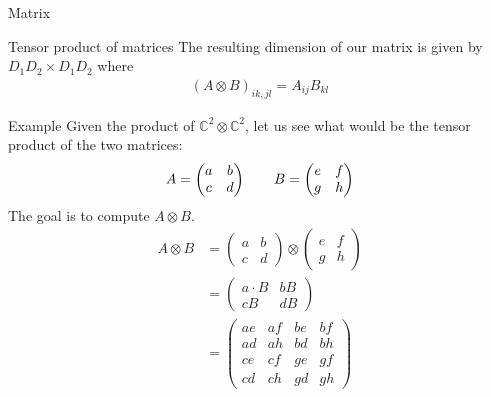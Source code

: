 \begin{parag}{Matrix}
\begin{subparag}{Tensor product of matrices}
		The resulting dimension of our matrix is given by $D_1D_2 \times D_1 D_2$ where
		\begin{align*} 
			 \left(A \otimes B\right)_{ik, jl} =  A_{ij} B_{kl}
		\end{align*}
	\end{subparag}
	\begin{subparag}{Example}
	    Given the product of $\mathbb{C}^2 \otimes \mathbb{C}^2$, let us see what would be the tensor product of the two matrices:
		\begin{align*} 
			A = \begin{pmatrix} a & b \\ c & d \end{pmatrix}   \quad \quad B = \begin{pmatrix} e & f \\ g & h \end{pmatrix} 
		\end{align*}
		The goal is to compute $A \otimes B$.
		\begin{align*} 
			A \otimes B &=  \begin{pmatrix} a & b \\ c & d \end{pmatrix} \otimes \begin{pmatrix} e & f \\ g & h \end{pmatrix} \\
											 &= \begin{pmatrix} a \cdot B & b B \\ c B & d B \end{pmatrix} \\
											 &= \begin{pmatrix} ae & af & be & bf \\ ad & ah & bd & bh \\ ce & cf & ge & gf \\ cd & ch & gd & gh \end{pmatrix} 
		\end{align*}
	\end{subparag}

\end{parag}



